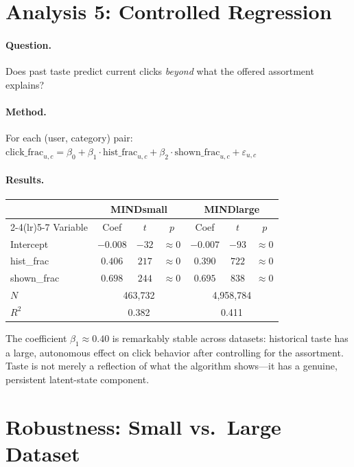 \documentclass[11pt]{article}
\begin{document}
\section{Analysis 5: Controlled Regression}

\paragraph{Question.} Does past taste predict current clicks \emph{beyond} what the offered assortment explains?

\paragraph{Method.} For each (user, category) pair:
$
\text{click\_frac}_{u,c} = \beta_0 + \beta_1 \cdot \text{hist\_frac}_{u,c} + \beta_2 \cdot \text{shown\_frac}_{u,c} + \varepsilon_{u,c}
$

\paragraph{Results.}
\begin{center}
\begin{tabular}{lcccccc}
\toprule
 & \multicolumn{3}{c}{MINDsmall} & \multicolumn{3}{c}{MINDlarge} \\
\cmidrule(lr){2-4}\cmidrule(lr){5-7}
Variable & Coef & $t$ & $p$ & Coef & $t$ & $p$ \\
\midrule
Intercept & $-0.008$ & $-32$ & $\approx 0$ & $-0.007$ & $-93$ & $\approx 0$ \\
hist\_frac & $0.406$ & $217$ & $\approx 0$ & $0.390$ & $722$ & $\approx 0$ \\
shown\_frac & $0.698$ & $244$ & $\approx 0$ & $0.695$ & $838$ & $\approx 0$ \\
\midrule
$N$ & \multicolumn{3}{c}{463,732} & \multicolumn{3}{c}{4,958,784} \\
$R^2$ & \multicolumn{3}{c}{0.382} & \multicolumn{3}{c}{0.411} \\
\bottomrule
\end{tabular}
\end{center}

The coefficient $\beta_1 \approx 0.40$ is remarkably stable across datasets: historical taste has a large, autonomous effect on click behavior after controlling for the assortment. Taste is not merely a reflection of what the algorithm shows---it has a genuine, persistent latent-state component.


\section{Robustness: Small vs.\ Large Dataset}
\end{document}
